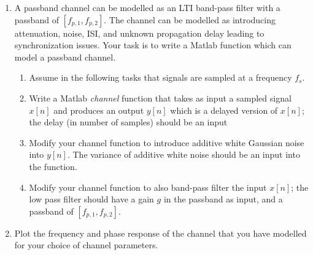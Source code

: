 \begin{enumerate}
\item A passband channel can be modelled as an LTI band-pass filter with a passband of $[f_{p,1}, f_{p,2}]$. The channel can be modelled as introducing attenuation, noise, ISI, and unknown propagation delay leading to synchronization issues. Your task is to write a Matlab function which can model a passband channel.
\begin{enumerate}
\item Assume in the following tasks that signals are sampled at a frequency $f_{s}$.
\item Write a Matlab \emph{channel} function that takes as input a sampled signal $x[n]$ and produces an output $y[n]$ which is a delayed version of $x[n]$; the delay (in number of samples) should be an input
\item Modify your channel function to introduce additive white Gaussian noise into $y[n]$. The variance of additive white noise should be an input into the function.
\item Modify your channel function to also band-pass filter the input $x[n]$; the low pass filter should have a gain $g$ in the passband as input, and a passband of $[f_{p,1}, f_{p,2}]$.
\end{enumerate}
\item Plot the frequency and phase response of the channel that you have modelled for your choice of channel parameters.
\end{enumerate}

